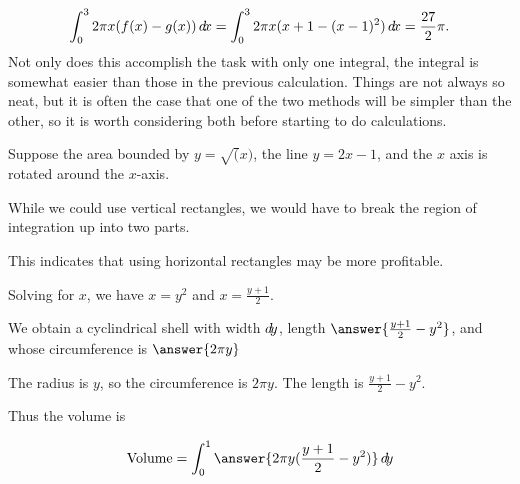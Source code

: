 \documentclass{ximera}
\begin{document}
$$
  \int_0^3 2\pi x(f(x)-g(x))\mathop{}\!d\! x=
  \int_0^3 2\pi x(x+1-(x-1)^2)\mathop{}\!d\! x={27\over2}\pi.
$$
Not only does this accomplish the task with only one integral, the
integral is somewhat easier than those in the previous
calculation. Things are not always so neat, but it is often the case
that one of the two methods will be simpler than the other, so it is
worth considering both before starting to do calculations.


\begin{example} 
Suppose the area bounded by $y=\sqrt(x)$, the line $y = 2x-1$, and the $x$ axis is  rotated
around the $x$-axis.

\begin{explanation}

\begin{image}
\end{image}

While we could use vertical rectangles, we would have to break the region of integration up into two parts.

This indicates that using horizontal rectangles may be more profitable.

Solving for $x$, we have $x = y^2$ and $x= \frac{y+1}{2}$.

We obtain a cyclindrical shell with width $\mathop{}\!d\! y$, length $\answer{\frac{y+1}{2} - y^2}$, and whose circumference is $\answer{2\pi y}$


\begin{hint}
	The radius is $y$, so the circumference is $2\pi y$.  The length is $\frac{y+1}{2} - y^2$.
\end{hint}

Thus the volume is

\[
\textrm{Volume} = \int_0^1 \answer{2\pi y (\frac{y+1}{2} - y^2)} \d y
\]
\end{explanation}
\end{example}
\end{document}
